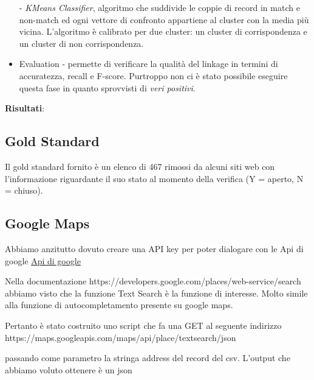 \documentclass[a4paper,12pt]{article}
\begin{document}
\begin{itemize}
- \textit{KMeans Classifier}, algoritmo che suddivide le coppie di record in match e non-match ed ogni vettore di confronto appartiene al cluster con la media più vicina. L'algoritmo è calibrato per due cluster: un cluster di corrispondenza e un cluster di non corrispondenza.
\item {Evaluation} - permette di verificare la qualità del linkage in termini di accuratezza, recall e F-score. Purtroppo non ci è stato possibile eseguire questa fase in quanto sprovvisti di \textit{veri positivi}.
\end{itemize}

\textbf{Risultati}: 

\subsection{Gold Standard}
Il gold standard fornito è un elenco di 467 rimossi da alcuni siti web con l'informazione riguardante il suo stato al momento della verifica (Y = aperto, N = chiuso). 



\subsection{Google Maps}
Abbiamo anzitutto dovuto creare una API key per poter dialogare con le Api di google
\href{https://console.cloud.google.com/google/maps-apis/overview?project=feisty-nectar-281812&folder=&organizationId=}{Api di google}


Nella documentazione https://developers.google.com/places/web-service/search abbiamo visto che la funzione 
Text Search è la funzione di interesse. Molto simile alla funzione di autocompletamento presente su google maps.

Pertanto è stato costruito uno script che fa una GET al seguente indirizzo 
https://maps.googleapis.com/maps/api/place/textsearch/json 

passando come parametro la stringa address del record del csv. L'output che abbiamo voluto ottenere è un json
\end{document}
